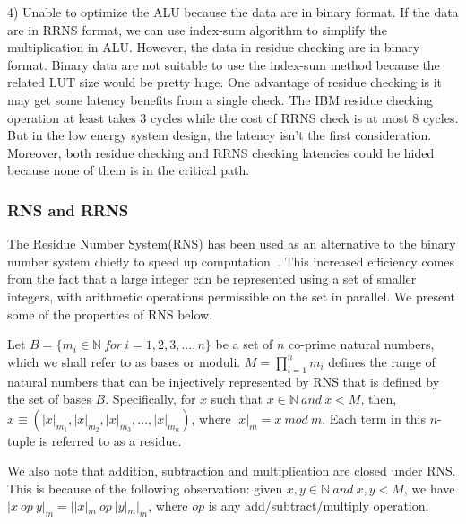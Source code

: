 \documentclass{sig-alternate}
\begin{document}
4) Unable to optimize the ALU because the data are in binary format. If the data are in RRNS format, we can use index-sum algorithm\cite{DengTACO18} to simplify the multiplication in ALU. However, the data in residue checking are in binary format. Binary data are not suitable to use the index-sum method because the related LUT size would be pretty huge. \newline
One advantage of residue checking is it may get some latency benefits from a single check. The IBM residue checking operation at least takes 3 cycles while the cost of RRNS check is at most 8 cycles. But in the low energy system design, the latency isn't the first consideration. Moreover, both residue checking and RRNS checking latencies could be hided because none of them is in the critical path. 


\subsubsection{RNS and RRNS}

The Residue Number System(RNS) has been used as an alternative to the binary number system chiefly to speed up computation~\cite{EricDSR,AndersonThesis}. This increased efficiency comes from the fact that a large integer can be represented using a set of smaller integers, with arithmetic operations permissible on the set in parallel. We present some of the properties of RNS below.

Let $B=\{m_i\in \mathbb{N}~for~i = 1,2,3,...,n\}$ be a set of $n$ co-prime natural numbers, which we shall refer to as bases or moduli. $M=\prod_{i=1}^{n}m_i$ defines the range of natural numbers that can be injectively represented by RNS that is defined by the set of bases $B$. Specifically, for $x$ such that $x\in\mathbb{N}~and ~x < M$, then, $x \equiv (|x|_{m_1}, |x|_{m_2}, |x|_{m_3}, ..., |x|_{m_n})$, where $|x|_m = x~mod~m$. Each term in this $n$-tuple is referred to as a residue.

We also note that addition, subtraction and multiplication are closed under RNS. This is because of the following observation: given $x, y \in \mathbb{N}~and ~x, y < M$, we have $|x~op~y|_m=||x|_m~op~|y|_m|_m$, where $op$ is any add/subtract/multiply operation.
\end{document}
